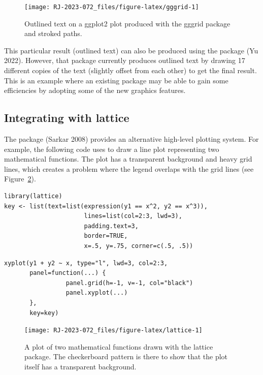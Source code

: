 \begin{figure}[h]
\texttt{[image: RJ-2023-072\_files/figure-latex/gggrid-1]} \caption{Outlined text on a ggplot2 plot produced with the gggrid package and stroked paths.}\label{fig:gggrid}
\end{figure}

This particular result (outlined text) can also be produced using
the  package (Yu 2022). However, that
package currently produces outlined text by drawing
17 different copies of the text (slightly offset from each other)
to get the final result. This is an example
where an existing package may be able to gain some efficiencies by
adopting some of the new graphics features.

\hypertarget{integrating-with-lattice}{%
\subsection{Integrating with lattice}\label{integrating-with-lattice}}

The  package (Sarkar 2008) provides an alternative
high-level plotting system. For example, the following code
uses  to draw a line plot representing two mathematical functions.
The plot has a transparent background and heavy grid lines, which
creates a problem where the legend overlaps with the grid lines
(see Figure~\ref{fig:lattice}).

\begin{verbatim}
library(lattice)
key <- list(text=list(expression(y1 == x^2, y2 == x^3)),
                      lines=list(col=2:3, lwd=3),
                      padding.text=3,
                      border=TRUE,
                      x=.5, y=.75, corner=c(.5, .5))
\end{verbatim}

\begin{verbatim}
xyplot(y1 + y2 ~ x, type="l", lwd=3, col=2:3,
       panel=function(...) { 
                 panel.grid(h=-1, v=-1, col="black")
                 panel.xyplot(...)
       },
       key=key)
\end{verbatim}

\begin{figure}[h]
\texttt{[image: RJ-2023-072\_files/figure-latex/lattice-1]} \caption{A plot of two mathematical functions drawn with the lattice package.  The checkerboard pattern is there to show that the plot itself has a transparent background.}\label{fig:lattice}
\end{figure}

